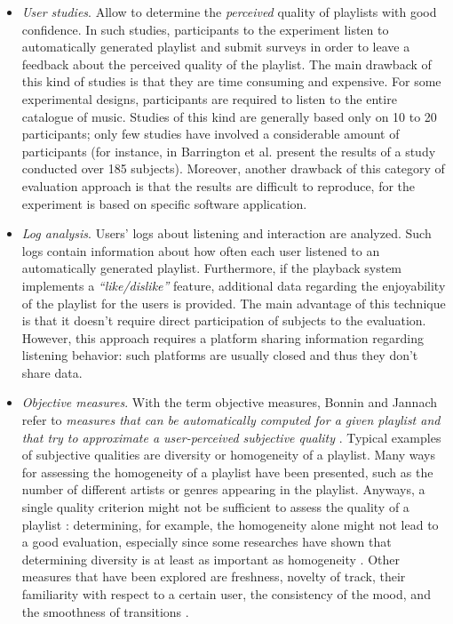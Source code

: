 \begin{itemize}
\item \textit{User studies}. Allow to determine the \textit{perceived} quality of playlists with good confidence. In such studies, participants to the experiment listen to automatically generated playlist and submit surveys in order to leave a feedback about the perceived quality of the playlist. The main drawback of this kind of studies is that they are time consuming and expensive. For some experimental designs, participants are required to listen to the entire catalogue of music. Studies of this kind are generally based only on 10 to 20 participants; only few studies have involved a considerable amount of participants (for instance, in \cite{barrington09} Barrington et al. present the results of a study conducted over 185 subjects). Moreover, another drawback of this category of evaluation approach is that the results are difficult to reproduce, for the experiment is based on specific software application.
\item \textit{Log analysis}. Users' logs about listening and interaction are analyzed. Such logs contain information about how often each user listened to an automatically generated playlist. Furthermore, if the playback system implements a \textit{``like/dislike''} feature, additional data regarding the enjoyability of the playlist for the users is provided. The main advantage of this technique is that it doesn't require direct participation of subjects to the evaluation. However, this approach requires a platform sharing information regarding listening behavior: such platforms are usually closed and thus they don't share data.  
\item \textit{Objective measures}. With the term objective measures, Bonnin and Jannach refer to \textit{measures that can be automatically computed for a given playlist and that try to approximate a user-perceived subjective quality} \cite{bonnin14} \cite{cremonesi11}. Typical examples of subjective qualities are diversity or homogeneity of a playlist. Many ways for assessing the homogeneity of a playlist have been presented, such as the number of different artists or genres appearing in the playlist. Anyways, a single quality criterion might not be sufficient to assess the quality of a playlist \cite{bonnin14}: determining, for example, the homogeneity alone might not lead to a good evaluation, especially since some researches have shown that determining diversity is at least as important as homogeneity \cite{slaney06} \cite{lee11}. Other measures that have been explored are freshness, novelty of track, their familiarity with respect to a certain user, the consistency of the mood, and the smoothness of transitions \cite{bonnin14}.

\end{itemize}
